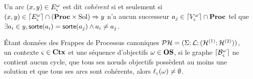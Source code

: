 \begin{definition}
  Un arc $(x, y) \in E_\varsigma^\omega$ est dit \emph{cohérent} si et seulement si
  $(x, y) \in \lceil E_\varsigma^\omega\rceil \cap (\mathbf{Proc} \times \mathrm{Sol}) \Rightarrow y$ n'a aucun successeur
  $a_j \in \lceil V_\varsigma^\omega\rceil \cap \mathbf{Proc}$
  tel que $\exists a_i \in y, \mathsf{sorte}(a_i) = \mathsf{sorte}(a_j) \wedge a_i \neq a_j$.
\end{definition}

\begin{theorem}
  Étant données des Frappes de Processus canoniques $\mathcal{PH} = (\Sigma; \mathcal{L}; (\mathcal{H}^{(1)};\mathcal{H}^{(2)}))$,
  un contexte $\varsigma \in \mathbf{Ctx}$ et une séquence d'objectifs $\omega \in \mathbf{OS}$,
  si le graphe $\lceil \mathcal{B}_\varsigma^\omega\rceil$ ne contient aucun cycle,
  que tous ses nœuds objectifs possèdent au moins une solution
  et que tous ses arcs sont cohérents,
  alors $\ell_\varsigma(\omega) \neq \emptyset$.
\end{theorem}

